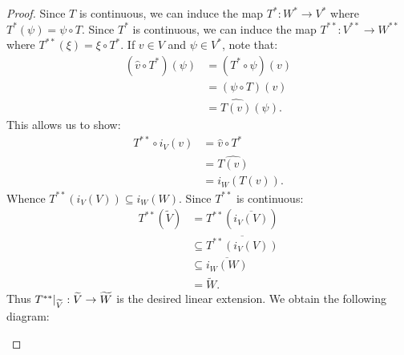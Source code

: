         \begin{proof}
            Since $T$ is continuous, we can induce the map $T^\ast:W^\ast \rightarrow V^\ast$ where $T^\ast(\psi) = \psi \circ T$. Since $T^\ast$ is continuous, we can induce the map $T^{\ast \ast}:V^{\ast \ast} \rightarrow W^{\ast \ast}$ where $T^{\ast \ast}(\xi) = \xi \circ T^\ast$. If $v \in V$ and $\psi \in V^\ast$, note that:
                \begin{equation*}
                \begin{split}
                    (\widehat{v}\circ T^\ast)(\psi) 
                    & = (T^\ast \circ \psi)(v) \\
                    & = (\psi \circ T)(v) \\
                    & = \widehat{T(v)}(\psi).
                \end{split}
                \end{equation*}
            This allows us to show:
                \begin{equation*}
                \begin{split}
                    T^{\ast \ast} \circ i_V(v)
                    & = \widehat{v} \circ T^\ast \\
                    & = \widehat{T(v)} \\
                    & = i_W(T(v)).
                \end{split}
                \end{equation*}
            Whence $T^{\ast \ast}(i_V(V)) \subseteq i_W(W)$. Since $T^{\ast \ast}$ is continuous:
                \begin{equation*}
                \begin{split}
                    T^{\ast \ast}\left(\widetilde{V}\right)
                    & = T^{\ast \ast}\left(\overline{i_V(V)}\right) \\
                    & \subseteq \overline{T^{\ast \ast}(i_V(V))} \\
                    & \subseteq \overline{i_W(W)} \\
                    & = \widetilde{W}.
                \end{split}
                \end{equation*}
            Thus $\restr{T^{\ast \ast}}{\widetilde{V}}: \widetilde{V} \rightarrow \widetilde{W}$ is the desired linear extension. We obtain the following diagram:
                \begin{center}
                    \begin{tikzcd}

\end{tikzcd}
\end{center}
\end{proof}
